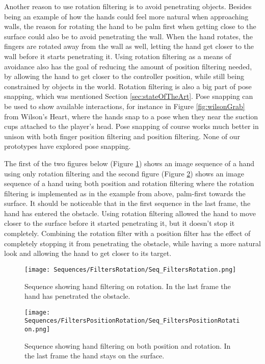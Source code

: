 Another reason to use rotation filtering is to avoid penetrating objects. Besides being an example of how the hands could feel more natural when approaching walls, the reason for rotating the hand to be palm first when getting close to the surface could also be to avoid penetrating the wall. When the hand rotates, the fingers are rotated away from the wall as well, letting the hand get closer to the wall before it starts penetrating it. Using rotation filtering as a means of avoidance also has the goal of reducing the amount of position filtering needed, by allowing the hand to get closer to the controller position, while still being constrained by objects in the world. Rotation filtering is also a big part of pose snapping, which was mentioned Section \ref{sec:stateOfTheArt}. Pose snapping can be used to show available interactions, for instance in Figure \ref{fig:wilsonGrab} from Wilson's Heart, where the hands snap to a pose when they near the suction cups attached to the player's head. Pose snapping of course works much better in unison with both finger position filtering and position filtering. None of our prototypes have explored pose snapping.

The first of the two figures below (Figure \ref{fig:filtersRotation}) shows an image sequence of a hand using only rotation filtering and the second figure (Figure \ref{fig:filtersPositionRotation}) shows an image sequence of a hand using both position and rotation filtering where the rotation filtering is implemented as in the example from above, palm-first towards the surface. It should be noticeable that in the first sequence in the last frame, the hand has entered the obstacle. Using rotation filtering allowed the hand to move closer to the surface before it started penetrating it, but it doesn't stop it completely. Combining the rotation filter with a position filter has the effect of completely stopping it from penetrating the obstacle, while having a more natural look and allowing the hand to get closer to its target.

\begin{figure}[H]
\centering
\texttt{[image: Sequences/FiltersRotation/Seq\_FiltersRotation.png]}
\caption{Sequence showing hand filtering on rotation. In the last frame the hand has penetrated the obstacle.}
\label{fig:filtersRotation}
\end{figure}

\begin{figure}[H]
\centering
\texttt{[image: Sequences/FiltersPositionRotation/Seq\_FiltersPositionRotation.png]}
\caption{Sequence showing hand filtering on both position and rotation. In the last frame the hand stays on the surface.}
\label{fig:filtersPositionRotation}
\end{figure}


